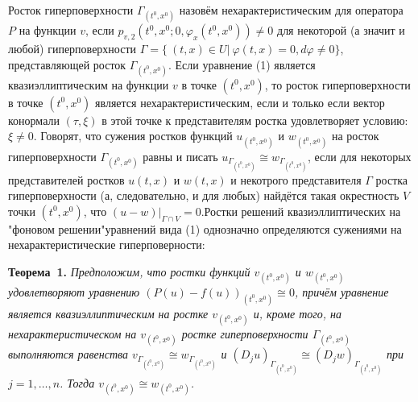 \documentclass[a5paper, 12pt, openbib]{report}
\begin{document}
Росток гиперповерхности $\Gamma_{(t^0,x^0)}$ назовём нехарактеристическим
для оператора $P$ на функции $v$, если
$p_{v,2}(t^0,x^0;0,\varphi_{x}(t^0,x^0))\not=0$
для некоторой (а значит и любой) гиперповерхности 
$\Gamma= \{~(t,x) \in U \vert~\varphi (t,x) =0, d\varphi\not=0\}$, представляющей росток $\Gamma_{(t^0,x^0)}$.
Если уравнение (1) является квазиэллиптическим на функции $v$ в точке $(t^0,x^0)$, то росток гиперповерхности в точке $(t^0,x^0)$ является нехарактеристическим, если и только если вектор конормали $(\tau,\xi)$ в этой точке к представителям ростка удовлетворяет условию: $\xi\not=0$.
Говорят, что сужения ростков функций $u_{(t^0,x^0)}$ и $w_{(t^0,x^0)}$
на росток гиперповерхности $\Gamma_{(t^0,x^0)}$  равны и писать
$u_{\Gamma_{(t^0,x^0)}}\cong w_{\Gamma_{(t^0,x^0)}}$,
если для некоторых представителей ростков $u(t,x)$ и $w(t,x)$   и некотрого представителя $\Gamma$ ростка гиперповерхности (а, следовательно, и для любых)
найдётся такая окрестность $V$ точки $(t^0,x^0)$,
что $(u-w)|_{\Gamma\cap V}=0$.\linebreak Ростки решений квазиэллиптических на "фоновом решении"\linebreak уравнений вида (1) однозначно определяются сужениями на нехарактеристические гиперповерности:


\textbf{Теорема~1.} {\it 
Предположим, что ростки функций $v_{(t^0,x^0)}$ и $w_{(t^0,x^0)}$ удовлетворяют уравнению $(P(u)-f(u))_{(t^0,x^0)}\cong 0$, причём уравнение
является квазиэллиптическим на ростке  $v_{(t^0,x^0)}$ и, кроме того, на нехарактеристическом на $v_{(t^0,x^0)}$ ростке гиперповерхности
 $\Gamma_{(t^0,x^0)}$ выполняются равенства 
$v_{\Gamma_{(t^0,x^0)}}\cong w_{\Gamma_{(t^0,x^0)}}$ и 
$(D_ju)_{\Gamma_{(t^0,x^0)}}\cong (D_jw)_{\Gamma_{(t^0,x^0)}}$ при
$j=1,\dots,n$. Тогда $v_{(t^0,x^0)}\cong w_{(t^0,x^0)}$.
}
\end{document}
